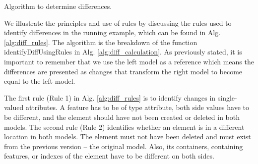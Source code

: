 \documentclass{jot}
\begin{document}
\IncMargin{1.5em}
\begin{algorithm}[H]
\begin{footnotesize}
\end{footnotesize}
\caption{Algorithm to determine differences.}
\label{alg:diff_calculation}
\end{algorithm}
\DecMargin{1.5em}
    
    We illustrate the principles and use of rules by discussing the rules used to identify differences in the running example, which can be found in Alg. \ref{alg:diff_rules}. The algorithm is the breakdown of the function \textsf{identifyDiffUsingRules} in Alg. \ref{alg:diff_calculation}. As previously stated, it is important to remember that we use the left model as a reference which means the differences are presented as changes that transform the right model to become equal to the left model. 
    
    The first rule (Rule 1) in Alg. \ref{alg:diff_rules} is to identify changes in single-valued attributes. A feature has to be of type \textsf{attribute}, both side values have to be different, and the element should have not been created or deleted in both models. The second rule (Rule 2) identifies whether an element is in a different location in both models. The element must not have been deleted and must exist from the previous version -- the original model. Also, its containers, containing features, or indexes of the element have to be different on both sides.
    
\end{document}
